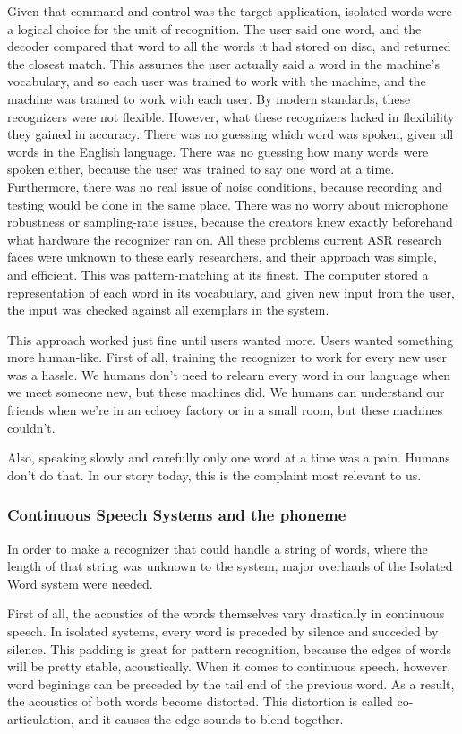 \documentclass[10pt,a4paper]{article}
\begin{document}
Given that command and control was the target application, isolated words were a logical choice for the unit of recognition. The user said one word, and the decoder compared that word to all the words it had stored on disc, and returned the closest match. This assumes the user actually said a word in the machine's vocabulary, and so each user was trained to work with the machine, and the machine was trained to work with each user. By modern standards, these recognizers were not flexible. However, what these recognizers lacked in flexibility they gained in accuracy. There was no guessing which word was spoken, given all words in the English language. There was no guessing how many words were spoken either, because the user was trained to say one word at a time. Furthermore, there was no real issue of noise conditions, because recording and testing would be done in the same place. There was no worry about microphone robustness or sampling-rate issues, because the creators knew exactly beforehand what hardware the recognizer ran on. All these problems current ASR research faces were unknown to these early researchers, and their approach was simple, and efficient. This was pattern-matching at its finest. The computer stored a representation of each word in its vocabulary, and given new input from the user, the input was checked against all exemplars in the system.

This approach worked just fine until users wanted more. Users wanted something more human-like. First of all, training the recognizer to work for every new user was a hassle. We humans don't need to relearn every word in our language when we meet someone new, but these machines did. We humans can understand our friends when we're in an echoey factory or in a small room, but these machines couldn't.

Also, speaking slowly and carefully only one word at a time was a pain. Humans don't do that. In our story today, this is the complaint most relevant to us.

\subsubsection{Continuous Speech Systems and the phoneme}

In order to make a recognizer that could handle a string of words, where the length of that string was unknown to the system, major overhauls of the Isolated Word system were needed.

First of all, the acoustics of the words themselves vary drastically in continuous speech. In isolated systems, every word is preceded by silence and succeded by silence. This padding is great for pattern recognition, because the edges of words will be pretty stable, acoustically. When it comes to continuous speech, however, word beginings can be preceded by the tail end of the previous word. As a result, the acoustics of both words become distorted. This distortion is called co-articulation, and it causes the edge sounds to blend together.
\end{document}
